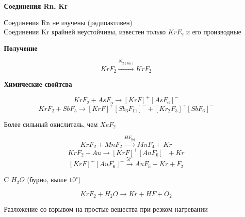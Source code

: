 \textbf{Соединения Rn, Kr}

Соединения Rn не изучены (радиоактивен)\\
Соединения Kr крайней неустойчивы, известен только $KrF_2$ и его производные

\textbf{Получение}

$$KrF_2 \xrightarrow{N_{2(liq)}} KrF_2$$

\textbf{Химические свойтсва}

$$KrF_2 + AsF_5 \rightarrow [KrF]^+[AsF_6]^-$$
$$KrF_2 + SbF_5 \rightarrow [KrF]^+[Sb_6F_{11}]^- + [Kr_2F_3]^+[SbF_6]^-$$

Более сильный окислитель, чем $XeF_2$

$$KrF_2 + MnF_2 \xrightarrow{HF_{liq}} MnF_4 + Kr$$
$$KrF_2 + Au \rightarrow [KrF]^+[AuF_6]^- + Kr$$
$$[KrF]^+[AuF_6]^- \xrightarrow{57^{\circ}} AuF_5 + Kr + F_2$$

C $H_2O$ (бурно, выше $10^{\circ}$)

$$KrF_2 + H_2O \rightarrow Kr + HF + O_2$$ 

Разложение со взрывом на простые вещества при резком нагревании
